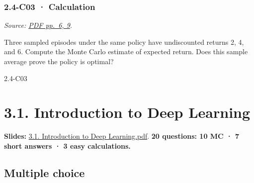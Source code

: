 \noindent\begin{minipage}{\linewidth}

\subsubsection{2.4-C03 · Calculation}\label{c03-calculation-6}

\emph{Source:
\href{../Lecture\%20Slides/2.4.\%20Policy\%20Search.pdf\#page=6}{PDF
pp.~6, 9}.}

Three sampled episodes under the same policy have undiscounted returns
2, 4, and 6. Compute the Monte Carlo estimate of expected return. Does
this sample average prove the policy is optimal?

\begin{solution}[26mm]{2.4-C03}

\end{solution}
\end{minipage}\par\medskip

\clearpage

\section{3.1. Introduction to Deep
Learning}\label{introduction-to-deep-learning}

\textbf{Slides:}
\href{../Lecture\%20Slides/3.1.\%20Introduction\%20to\%20Deep\%20Learning.pdf}{3.1.
Introduction to Deep Learning.pdf}. \textbf{20 questions: 10 MC · 7
short answers · 3 easy calculations.}

\subsection{Multiple choice}\label{multiple-choice-7}

